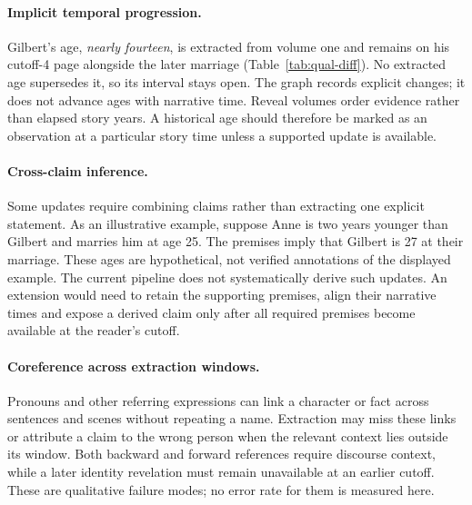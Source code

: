 \paragraph{Implicit temporal progression.}
Gilbert's age, \emph{nearly fourteen}, is extracted from volume one and remains on his
cutoff-4 page alongside the later marriage (Table~\ref{tab:qual-diff}). No extracted
age supersedes it, so its interval stays open. The graph records explicit changes; it does
not advance ages with narrative time. Reveal volumes order evidence rather than elapsed
story years. A historical age should therefore be marked as an observation at a particular
story time unless a supported update is available.

\paragraph{Cross-claim inference.}
Some updates require combining claims rather than extracting one explicit statement.
As an illustrative example, suppose Anne is two years younger than Gilbert and marries
him at age 25. The premises imply that Gilbert is 27 at their marriage. These ages are
hypothetical, not verified annotations of the displayed example. The current pipeline
does not systematically derive such updates. An extension would need to retain the
supporting premises, align their narrative times and expose a derived claim only after
all required premises become available at the reader's cutoff.

\paragraph{Coreference across extraction windows.}
Pronouns and other referring expressions can link a character or fact across sentences
and scenes without repeating a name. Extraction may miss these links or attribute a
claim to the wrong person when the relevant context lies outside its window. Both backward
and forward references require discourse context, while a later identity revelation must
remain unavailable at an earlier cutoff. These are qualitative failure modes; no error
rate for them is measured here.
